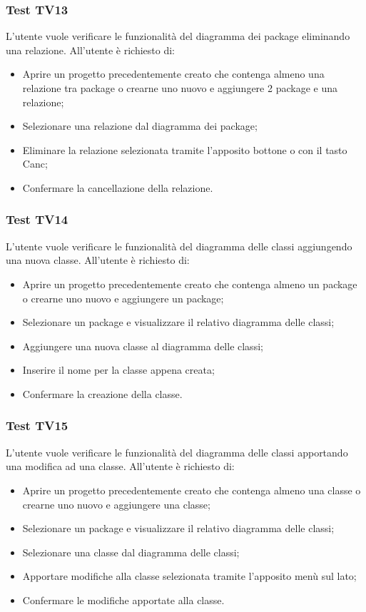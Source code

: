 \documentclass[../PianoDiQualifica.tex]{subfiles}
\begin{document}
	\subsubsection{Test TV13} 
	L'utente vuole verificare le funzionalità del diagramma dei package eliminando una relazione. 
	All'utente è richiesto di: 
	\begin{itemize} 
		\item Aprire un progetto precedentemente creato che contenga almeno una relazione tra package o crearne uno nuovo e aggiungere 2 package e una relazione; 
		\item Selezionare una relazione dal diagramma dei package; 
		\item Eliminare la relazione selezionata tramite l'apposito bottone o con il tasto Canc; 
		\item Confermare la cancellazione della relazione. 
	\end{itemize} 
	
	
	\subsubsection{Test TV14} 
	L'utente vuole verificare le funzionalità del diagramma delle classi aggiungendo una nuova classe. 
	All'utente è richiesto di: 
	\begin{itemize} 
		\item Aprire un progetto precedentemente creato che contenga almeno un package o crearne uno nuovo e aggiungere un package;
		\item Selezionare un package e visualizzare il relativo diagramma delle classi; 
		\item Aggiungere una nuova classe al diagramma delle classi; 
		\item Inserire il nome per la classe appena creata; 
		\item Confermare la creazione della classe. 
	\end{itemize} 
	
	\subsubsection{Test TV15} 
	L'utente vuole verificare le funzionalità del diagramma delle classi apportando una modifica ad una classe. 
	All'utente è richiesto di: 
	\begin{itemize} 
		\item Aprire un progetto precedentemente creato che contenga almeno una classe o crearne uno nuovo e aggiungere una classe;
		\item Selezionare un package e visualizzare il relativo diagramma delle classi; 
		\item Selezionare una classe dal diagramma delle classi; 
		\item Apportare modifiche alla classe selezionata tramite l'apposito menù sul lato; 
		\item Confermare le modifiche apportate alla classe. 
	\end{itemize} 
	
\end{document}
